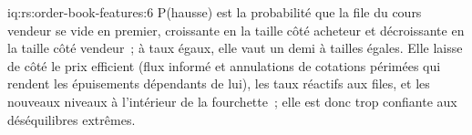 \begin{solution}{iq:rs:order-book-features:6}
P(hausse) est la probabilité que la file du cours vendeur se vide en premier, croissante en la taille côté acheteur et décroissante en la taille côté vendeur~; à taux égaux, elle vaut
un demi à tailles égales. Elle laisse de côté le prix efficient (flux informé et annulations de cotations périmées qui rendent les épuisements dépendants de
lui), les taux réactifs aux files, et les nouveaux niveaux à l'intérieur de la fourchette~; elle est donc trop confiante aux déséquilibres extrêmes.
\end{solution}
